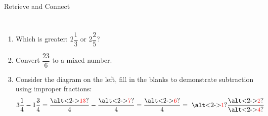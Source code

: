 \documentclass{beamer}
\newcommand{\ashow}[1]{\uncover<2->{\textcolor{red}{\small #1}}}
\newcommand{\ashowq}[1]{\alt<2->{\textcolor{red}{\small #1}}{?}}
\begin{document}
\begin{frame}{Retrieve and Connect}
\begin{columns}
\begin{enumerate}
  \item Which is greater: $2\dfrac{1}{3}$ or $2\dfrac{2}{5}$? \ashow{$2\frac{2}{5}$}
  \item Convert $\dfrac{23}{6}$ to a mixed number. \ashow{$=3\frac{5}{6}$}
  \item Consider the diagram on the left, fill in the blanks to demonstrate subtraction using improper fractions:
  \[
    3\frac{1}{4} - 1\frac{3}{4} = \frac{\text{{\ashowq{13}}}}{4} - \frac{\text{{\ashowq{7}}}}{4} = \frac{\text{{\ashowq{6}}}}{4} = \ \text{{\ashowq{1}}} \frac{\text{{\ashowq{2}}}}{\text{{\ashowq{4}}}}
  \]
  
\end{enumerate}

\end{columns}
\end{frame}
\end{document}
